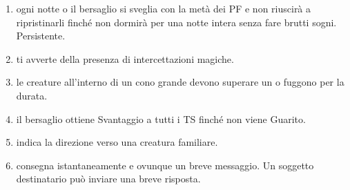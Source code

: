 \documentclass[itdr]{subfiles}
\begin{document}
\begin{enumerate}
	\item {}  ogni notte o il bersaglio si sveglia con la metà dei PF e non riuscirà a ripristinarli finché non dormirà per una notte intera senza fare brutti sogni. Persistente.
	\item {} ti avverte della presenza di intercettazioni magiche.
	\item {} le creature all'interno di un cono grande devono superare un  o fuggono per la durata.
	\item {} il bersaglio ottiene Svantaggio a tutti i TS finché non viene Guarito.
	\item {} indica la direzione verso una creatura familiare.
	\item {} consegna istantaneamente e ovunque un breve messaggio. Un soggetto destinatario può inviare una breve \mbox{risposta}.

\vfill
\break


\end{enumerate}
\end{document}

